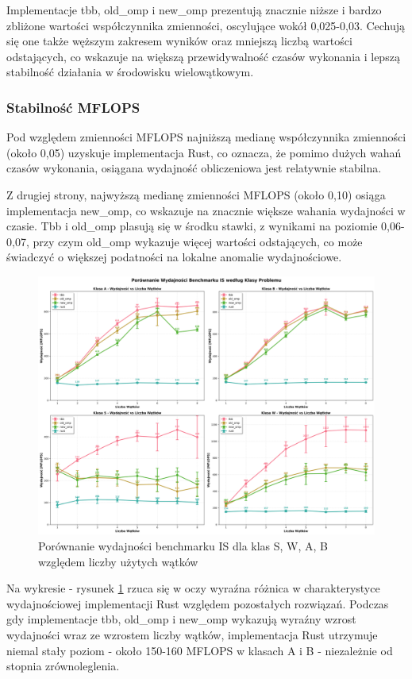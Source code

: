 Implementacje tbb, old\_omp i new\_omp prezentują znacznie niższe i bardzo zbliżone wartości współczynnika zmienności, oscylujące wokół 0,025-0,03. Cechują się one także węższym zakresem wyników oraz mniejszą liczbą wartości odstających, co wskazuje na większą przewidywalność czasów wykonania i lepszą stabilność działania w środowisku wielowątkowym.

\subsubsection{Stabilność MFLOPS}
Pod względem zmienności MFLOPS najniższą medianę współczynnika zmienności (około 0,05) uzyskuje implementacja Rust, co oznacza, że pomimo dużych wahań czasów wykonania, osiągana wydajność obliczeniowa jest relatywnie stabilna.

Z drugiej strony, najwyższą medianę zmienności MFLOPS (około 0,10) osiąga implementacja new\_omp, co wskazuje na znacznie większe wahania wydajności w czasie. Tbb i old\_omp plasują się w środku stawki, z wynikami na poziomie 0,06-0,07, przy czym old\_omp wykazuje więcej wartości odstających, co może świadczyć o większej podatności na lokalne anomalie wydajnościowe.


\begin{figure}[H]
    \centering
    \includegraphics[width=\textwidth]{analiza/images/parallel/is/x86/is_porownanie_wydajnosci.png}
    \caption{Porównanie wydajności benchmarku IS dla klas S, W, A, B względem liczby użytych wątków}
    \label{is_porownanie_wydajnosci_x86}
\end{figure}
Na wykresie - rysunek \ref{is_porownanie_wydajnosci_x86} rzuca się w oczy wyraźna różnica w charakterystyce wydajnościowej implementacji Rust względem pozostałych rozwiązań. Podczas gdy implementacje tbb, old\_omp i new\_omp wykazują wyraźny wzrost wydajności wraz ze wzrostem liczby wątków, implementacja Rust utrzymuje niemal stały poziom - około 150-160 MFLOPS w klasach A i B - niezależnie od stopnia zrównoleglenia.

